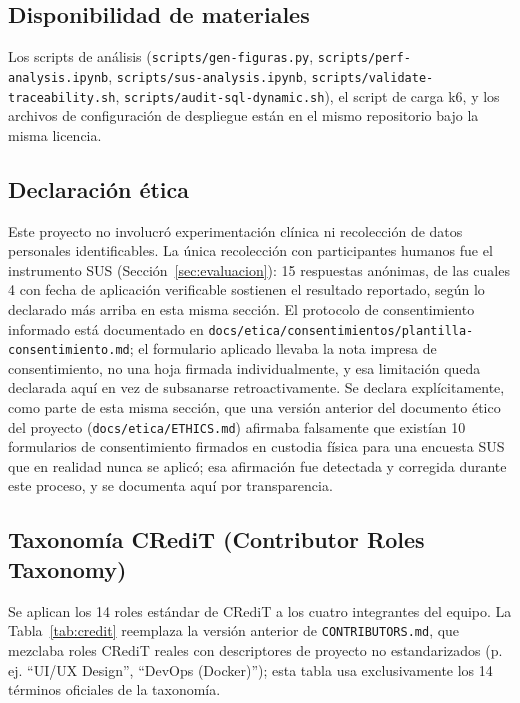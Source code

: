 \subsection*{Disponibilidad de materiales}
Los scripts de análisis (\texttt{scripts/gen-figuras.py}, \texttt{scripts/perf-analysis.ipynb},
\texttt{scripts/sus-analysis.ipynb}, \texttt{scripts/validate-traceability.sh},
\texttt{scripts/audit-sql-dynamic.sh}), el script de carga k6, y los archivos de configuración de
despliegue están en el mismo repositorio bajo la misma licencia.

\subsection*{Declaración ética}
Este proyecto no involucró experimentación clínica ni recolección de datos personales identificables. La
única recolección con participantes humanos fue el instrumento SUS (Sección~\ref{sec:evaluacion}): 15
respuestas anónimas, de las cuales 4 con fecha de aplicación verificable sostienen el resultado
reportado, según lo declarado más arriba en esta misma sección. El protocolo de consentimiento informado
está documentado en \texttt{docs/etica/consentimientos/plantilla-consentimiento.md}; el formulario
aplicado llevaba la nota impresa de consentimiento, no una hoja firmada individualmente, y esa
limitación queda declarada aquí en vez de subsanarse retroactivamente. Se
declara explícitamente, como parte de esta misma sección, que una versión anterior del documento ético
del proyecto (\texttt{docs/etica/ETHICS.md}) afirmaba falsamente que existían 10 formularios de
consentimiento firmados en custodia física para una encuesta SUS que en realidad nunca se aplicó; esa
afirmación fue detectada y corregida durante este proceso, y se documenta aquí por transparencia.

\subsection*{Taxonomía CRediT (Contributor Roles Taxonomy)}

Se aplican los 14 roles estándar de CRediT \cite{brand2015} a los cuatro integrantes del equipo. La
Tabla~\ref{tab:credit} reemplaza la versión anterior de \texttt{CONTRIBUTORS.md}, que mezclaba roles
CRediT reales con descriptores de proyecto no estandarizados (p. ej. ``UI/UX Design'', ``DevOps
(Docker)''); esta tabla usa exclusivamente los 14 términos oficiales de la taxonomía.


